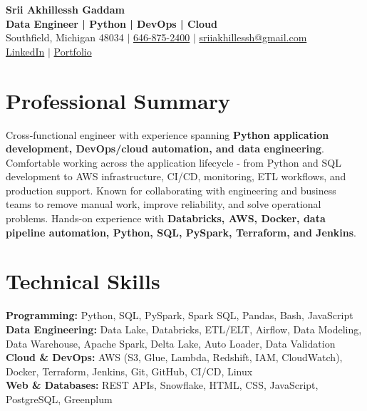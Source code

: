 \documentclass[letterpaper,10pt]{article}
\begin{document}
\fontsize{9.35pt}{10.45pt}\selectfont

\begin{center}
    {\LARGE \textbf{Srii Akhillessh Gaddam}} \\[-1pt]
    \textbf{Data Engineer | Python | DevOps | Cloud} \\[2pt]
    Southfield, Michigan 48034 $|$
    \href{tel:6468752400}{646-875-2400} $|$
    \href{mailto:sriiakhillessh@gmail.com}{sriiakhillessh@gmail.com} \\[1pt]
    \href{https://www.linkedin.com/in/srii-akhiilessh-gaddam-b48668191/}{LinkedIn} $|$
    \href{https://sriiakhillesshg.github.io/portfolio/}{Portfolio}
\end{center}
\vspace{-8pt}

\section{Professional Summary}
\small{Cross-functional engineer with experience spanning \textbf{Python application development, DevOps/cloud automation, and data engineering}. Comfortable working across the application lifecycle - from Python and SQL development to AWS infrastructure, CI/CD, monitoring, ETL workflows, and production support. Known for collaborating with engineering and business teams to remove manual work, improve reliability, and solve operational problems. Hands-on experience with \textbf{Databricks, AWS, Docker, data pipeline automation, Python, SQL, PySpark, Terraform, and Jenkins}.}

\section{Technical Skills}
\small{
\textbf{Programming:} Python, SQL, PySpark, Spark SQL, Pandas, Bash, JavaScript \\
\textbf{Data Engineering:} Data Lake, Databricks, ETL/ELT, Airflow, Data Modeling, Data Warehouse, Apache Spark, Delta Lake, Auto Loader, Data Validation \\
\textbf{Cloud \& DevOps:} AWS (S3, Glue, Lambda, Redshift, IAM, CloudWatch), Docker, Terraform, Jenkins, Git, GitHub, CI/CD, Linux \\
\textbf{Web \& Databases:} REST APIs, Snowflake, HTML, CSS, JavaScript, PostgreSQL, Greenplum
}
\end{document}
